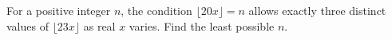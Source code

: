 For a positive integer $n$, the condition $\lfloor20x\rfloor=n$ allows exactly three distinct values of $\lfloor23x\rfloor$ as real $x$ varies. Find the least possible $n$.
